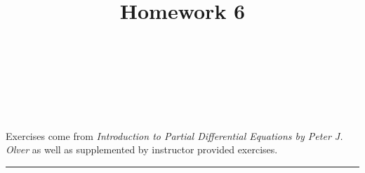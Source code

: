 \documentclass[10pt]{amsart}
\theoremstyle{nonumberplain}
\begin{document}
\pagestyle{empty}

\newcommand{\mline}{\vspace{.2in}\hrule\vspace{.2in}}

\noindent
{} \\
 \\
 \\
 \\

\title{\bf {Homework 6} }


\maketitle
\noindent
Exercises come from \textit{Introduction to Partial Differential Equations by Peter J. Olver} as well as supplemented by instructor provided exercises.
\mline
\end{document}
